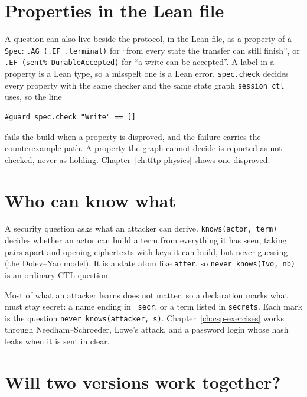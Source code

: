 \section{Properties in the Lean file}

A question can also live beside the protocol, in the Lean file, as a property of
a \texttt{Spec}: \texttt{.AG (.EF .terminal)} for ``from every state the
transfer can still finish'', or \texttt{.EF (sent\% DurableAccepted)} for ``a
write can be accepted''. A label in a property is a Lean type, so a misspelt one
is a Lean error. \texttt{spec.check} decides every property with the same checker
and the same state graph \texttt{session\_ctl} uses, so the line

\begin{lstlisting}[language={},basicstyle=\ttfamily\small]
#guard spec.check "Write" == []
\end{lstlisting}

\noindent fails the build when a property is disproved, and the failure carries the
counterexample path. A property the graph cannot decide is reported as not
checked, never as holding. Chapter~\ref{ch:tftp-physics} shows one disproved.

\section{Who can know what}

A security question asks what an attacker can derive. \texttt{knows(actor,
term)} decides whether an actor can build a term from everything it has seen,
taking pairs apart and opening ciphertexts with keys it can build, but never
guessing (the Dolev--Yao model). It is a state atom like \texttt{after}, so
\texttt{never knows(Ivo, nb)} is an ordinary CTL question.

Most of what an attacker learns does not matter, so a declaration marks what
must stay secret: a name ending in \texttt{\_secr}, or a term listed in
\texttt{secrets}. Each mark is the question \texttt{never knows(attacker, s)}.
Chapter~\ref{ch:csp-exercises} works through Needham--Schroeder, Lowe's attack,
and a password login whose hash leaks when it is sent in clear.

\section{Will two versions work together?}

